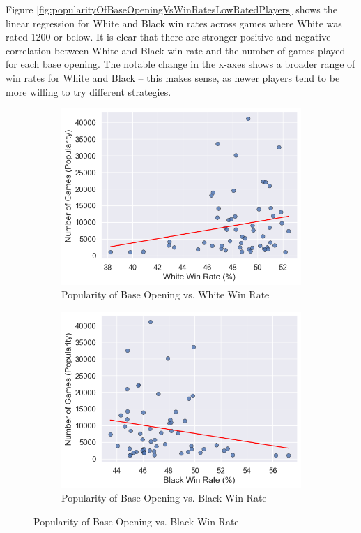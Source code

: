 \documentclass[a4paper, 11pt]{article}
\begin{document}
Figure \ref{fig:popularityOfBaseOpeningVsWinRatesLowRatedPlayers} shows the linear regression for White and Black win rates across games where White was rated 1200 or below. It is clear that there are stronger positive and negative correlation between White and Black win rate and the number of games played for each base opening. The notable change in the x-axes shows a broader range of win rates for White and Black -- this makes sense, as newer players tend to be more willing to try different strategies.

\begin{figure}[H]
    \centering
    \caption{Popularity of Base Opening vs. Win Rates (Players Rated 1200 and Below)}
    \label{fig:popularityOfBaseOpeningVsWinRatesLowRatedPlayers}
    \begin{subfigure}{0.49\textwidth}
        \centering
        \caption{Popularity of Base Opening vs. White Win Rate}
        \label{fig:popularityOfBaseOpeningVsWhiteWinRateLowRatedPlayers}
        \includegraphics[width=\textwidth]{Popularity of Base Opening vs. White Win Rate (Rated 1200-).png}
    \end{subfigure}
    \hfill
    \begin{subfigure}{0.49\textwidth}
        \centering
        \caption{Popularity of Base Opening vs. Black Win Rate}
        \label{fig:popularityOfBaseOpeningVsBlackWinRateLowRatedPlayers}
        \includegraphics[width=\textwidth]{Popularity of Base Opening vs. Black Win Rate (Rated 1200-).png}

\end{subfigure}
\end{figure}
\end{document}
